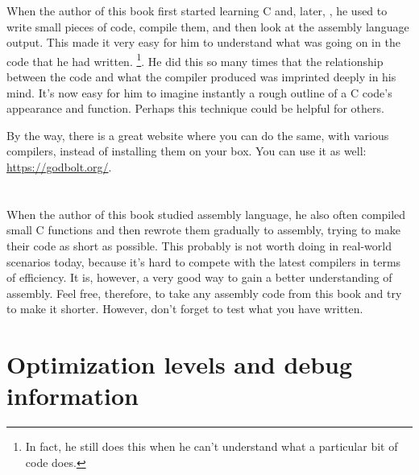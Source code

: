 
When the author of this book first started learning C and, later, \Cpp, he used to write small pieces of code, compile them,
and then look at the assembly language output. This made it very easy for him to understand what was going on in the code that he had written.
\footnote{In fact, he still does this when he can't understand what a particular bit of code does.}.
He did this so many times that the relationship between the \CCpp code and what the compiler produced was imprinted deeply in his mind.
It's now easy for him to imagine instantly a rough outline of a C code's appearance and function.
Perhaps this technique could be helpful for others.


By the way, there is a great website where you can do the same, with various compilers, instead of installing them on your box.
You can use it as well: \url{https://godbolt.org/}.

\section*{\Exercises}

When the author of this book studied assembly language, he also often compiled small C functions and then rewrote
them gradually to assembly, trying to make their code as short as possible.
This probably is not worth doing in real-world scenarios today,
because it's hard to compete with the latest compilers in terms of efficiency. It is, however, a very good way to gain a better understanding of assembly.
Feel free, therefore, to take any assembly code from this book and try to make it shorter.
However, don't forget to test what you have written.

\section*{Optimization levels and debug information}

